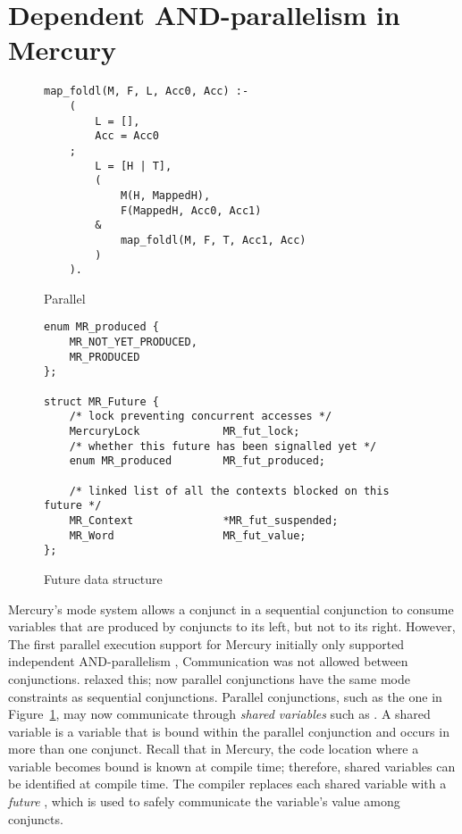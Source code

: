 
\section{Dependent AND-parallelism in Mercury}
\label{sec:backgnd_deppar}

\begin{figure}
\begin{verbatim}
map_foldl(M, F, L, Acc0, Acc) :-
    (
        L = [],
        Acc = Acc0
    ;
        L = [H | T],
        (
            M(H, MappedH),
            F(MappedH, Acc0, Acc1)
        &
            map_foldl(M, F, T, Acc1, Acc)
        )
    ).
\end{verbatim}
\caption{Parallel \mapfoldl{}}
\label{fig:mapfoldl}
\end{figure}

\begin{figure}
\begin{verbatim}
enum MR_produced {
    MR_NOT_YET_PRODUCED, 
    MR_PRODUCED
};

struct MR_Future {
    /* lock preventing concurrent accesses */
    MercuryLock             MR_fut_lock;
    /* whether this future has been signalled yet */
    enum MR_produced        MR_fut_produced;

    /* linked list of all the contexts blocked on this future */
    MR_Context              *MR_fut_suspended;
    MR_Word                 MR_fut_value;
};
\end{verbatim}
\caption{Future data structure}
\label{fig:future}
\end{figure}

Mercury's mode system allows a conjunct in a sequential conjunction to consume
variables that are produced by conjuncts to its left, but not to its right.
However,
The first parallel execution support for Mercury
initially only supported independent AND-parallelism
\citep{conway:2002:par},
Communication was not allowed between conjunctions.
\citet*{wang:2011:dep-par,wang:2006:hons} relaxed this;
now parallel conjunctions have the same mode constraints as sequential
conjunctions.
Parallel conjunctions,
such as the one in Figure~\ref{fig:mapfoldl},
may now
communicate through \emph{shared variables} such as .
A shared variable is a variable that is bound within the parallel
conjunction and occurs in more than one conjunct.
Recall that in Mercury,
the code location where a variable becomes bound is known
at compile time;
therefore,
shared variables can be identified at compile time.
The compiler replaces each shared variable with a \emph{future}
\citep{halstead:1984:multilisp},
which is used to safely communicate the variable's value among conjuncts.


